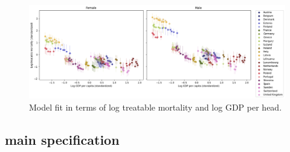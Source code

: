 \documentclass{article}
\begin{document}
\begin{figure}[htbp]
\centering
\includegraphics[width=.9\linewidth]{./figures/check_fit.png}
\caption{\label{fig:orgf9a24dd}Model fit in terms of log treatable mortality and log GDP per head.}
\end{figure}

\subsection{main specification}
\label{sec:org88414ab}
\end{document}
